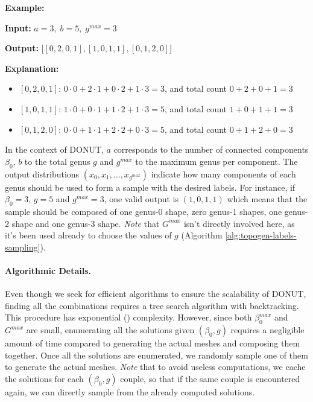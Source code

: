 \begin{tcolorbox}[bluebox]
  \textbf{Example:}

  \textbf{Input:} $a = 3,\; b = 5,\; g^{max} = 3$

  \textbf{Output:} $\big[ [0, 2, 0, 1], [1, 0, 1, 1], [0, 1, 2, 0]\big]$

  \textbf{Explanation:}
  \begin{itemize}
    \item $[0, 2, 0, 1]$: $0 \cdot 0 + 2 \cdot 1 + 0 \cdot 2 + 1 \cdot 3 = 3$, and total count $0+2+0+1=3$
    \item $[1, 0, 1, 1]$: $1 \cdot 0 + 0 \cdot 1 + 1 \cdot 2 + 1 \cdot 3 = 5$, and total count $1+0+1+1=3$
    \item $[0, 1, 2, 0]$: $0 \cdot 0 + 1 \cdot 1 + 2 \cdot 2 + 0 \cdot 3 = 5$, and total count $0+1+2+0=3$
  \end{itemize}
\end{tcolorbox}

In the context of DONUT, $a$ corresponds to the number of connected components $\beta_0$, $b$ to the total genus $g$ and $g^{max}$ to the maximum genus per component. The output distributions $(x_0, x_1, \dots, x_{g^{max}})$ indicate how many components of each genus should be used to form a sample with the desired labels. For instance, if $\beta_0 = 3$, $g = 5$ and $g^{max} = 3$, one valid output is $(1, 0, 1, 1)$ which means that the sample should be composed of one genus-0 shape, zero genus-1 shapes, one genus-2 shape and one genus-3 shape. \textit{Note} that $G^{max}$ isn't directly involved here, as it's been used already to choose the values of $g$ (Algorithm \ref{alg:topogen-labels-sampling}).

\paragraph{Algorithmic Details.} 
Even though we seek for efficient algorithms to ensure the scalability of DONUT, finding all the combinations requires a tree search algorithm with backtracking. This procedure has exponential () complexity. However, since both $\beta_0^{max}$ and $G^{max}$ are small, enumerating all the solutions given $(\beta_0, g)$ requires a negligible amount of time compared to generating the actual meshes and composing them together. Once all the solutions are enumerated, we randomly sample one of them to generate the actual meshes. \textit{Note} that to avoid useless computations, we cache the solutions for each $(\beta_0, g)$ couple, so that if the same couple is encountered again, we can directly sample from the already computed solutions.

